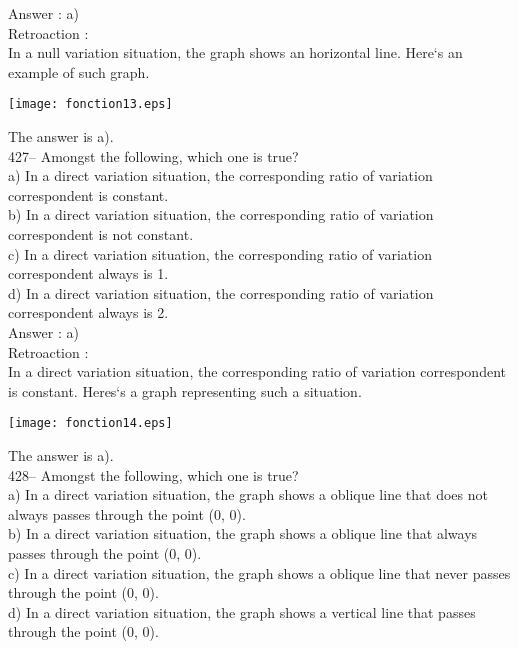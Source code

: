 ﻿\documentclass[letterpaper, 12pt]{article}
\begin{document}
Answer :  a)\\

Retroaction : \\
In a null variation situation, the graph shows an horizontal line.
Here`s an example of such graph.\\
    \begin{center}
    \texttt{[image: fonction13.eps]}
    \end{center}

The answer is a).\\

427-- Amongst the following, which one is true?\\
a) In a direct variation situation, the corresponding ratio of variation
correspondent is constant.\\
b) In a direct variation situation, the corresponding ratio of variation
correspondent is not constant.\\
c) In a direct variation situation, the corresponding ratio of variation
correspondent always is 1.\\
d) In a direct variation situation, the corresponding ratio of variation
correspondent always is 2.\\

Answer :  a)\\

Retroaction : \\
In a direct variation situation, the corresponding ratio of variation
correspondent is constant.
Heres`s a graph representing such a situation.\\
    \begin{center}
    \texttt{[image: fonction14.eps]}
    \end{center}

The answer is a).\\

428-- Amongst the following, which one is true?\\
a) In a direct variation situation, the graph shows a
oblique line that does not always passes through the point (0, 0).\\
b) In a direct variation situation, the graph shows a
oblique line that always passes through the point (0, 0).\\
c) In a direct variation situation, the graph shows a
oblique line that never passes through the point (0, 0).\\
d) In a direct variation situation, the graph shows a
vertical line that passes through the point (0, 0).\\
\end{document}
